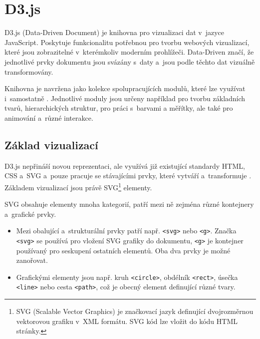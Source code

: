 \documentclass[
  digital, %
  oneside, %
  table,   %
  nolof,     %
  nolot,     %
  nocover
]{fithesis3}
\begin{document}
\section{D3.js}
D3.js (Data-Driven Document) je knihovna pro vizualizaci dat v~jazyce JavaScript. Poskytuje funkcionalitu potřebnou pro tvorbu webových vizualizací, které jsou zobrazitelné v~kterémkoliv moderním prohlížeči. Data-Driven značí, že jednotlivé prvky dokumentu jsou svázány s~daty a~jsou podle těchto dat vizuálně transformovány. \par
Knihovna je navržena jako kolekce spolupracujících modulů, které lze využívat i~samostatně \cite{d3APIReference}. Jednotlivé moduly jsou určeny například pro tvorbu základních tvarů, hierarchických struktur, pro práci s~barvami a měřítky, ale také pro animování a~různé interakce.

\subsection{Základ vizualizací}
D3.js nepřináší novou reprezentaci, ale využívá již existující standardy HTML, CSS a~SVG a~pouze pracuje se stávajícími prvky, které vytváří a~transformuje \cite{d3jsorg}. Základem vizualizací jsou právě SVG\footnote{SVG (Scalable Vector Graphics) je značkovací jazyk definující dvojrozměrnou vektorovou grafiku v~XML formátu. SVG kód lze vložit do kódu HTML stránky.} elementy.\par
SVG obsahuje elementy mnoha kategorií, patří mezi ně zejména různé kontejnery a~grafické prvky. \cite{svgMozillaorg}
\begin{itemize}
  \item Mezi obalující a~strukturální prvky patří např. \verb|<svg>| nebo \verb|<g>|. Značka \verb|<svg>| se používá pro vložení SVG grafiky do dokumentu, \verb|<g>| je kontejner používaný pro seskupení ostatních elementů. Oba dva prvky je možné zanořovat.
  \item Grafickými elementy jsou např. kruh \verb|<circle>|, obdélník \verb|<rect>|, úsečka \verb|<line>| nebo cesta \verb|<path>|, což je obecný element definující různé tvary.
\end{itemize}
\end{document}
